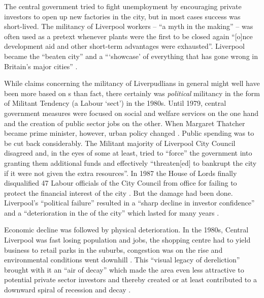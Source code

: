 The central government tried to fight unemployment by encouraging private investors to open up new factories in the city, but in most cases success was short-lived.
The militancy of Liverpool workers -- ``a myth in the making'' -- was often used as a pretext whenever  plants were the first to be closed again ``[o]nce development aid and other short-term advantages were exhausted''\citep[cf.][52]{belchem2006a}.
Liverpool became the ``beaten city'' and a ```showcase' of everything that has gone wrong in Britain's major cities'' \citep[\emph{Daily Mirror}, 11 October 1982, cited in][52--53]{belchem2006a}.

While claims concerning the militancy of Liverpudlians in general might well have been more based on s than fact, there certainly was \emph{political} militancy in the form of Militant Tendency (a Labour `sect') in the 1980s.
Until 1979, central government measures were focused on social and welfare services on the one hand and the creation of public sector jobs on the other. When Margaret Thatcher became prime minister, however, urban policy changed \citep[cf.][19]{juddparkinson1990a}.
Public spending was to be cut back considerably.
The Militant majority of Liverpool City Council disagreed and, in the eyes of some at least, tried to \enquote{force} the government into granting them additional funds and effectively ``threaten[ed] to bankrupt the city if it were not given the extra resources''.
In 1987 the House of Lords finally disqualified 47 Labour officials of the City Council from office for failing to protect the financial interest of the city \citep[cf.][249--250]{parkinson1990}.
But the damage had been done.
Liverpool's ``political failure'' \citep[241]{parkinson1990} resulted in a ``sharp decline in investor confidence'' and a ``deterioration in the  of the city'' which lasted for many years \citep[172]{couch2003a}.

Economic decline was followed by physical deterioration.
In the 1980s, Central Liverpool was fast losing population and jobs, the shopping centre had to yield business to retail parks in the suburbs, congestion was on the rise and environmental conditions went downhill \citep[cf.][38]{couch2003}.
This ``visual legacy of dereliction'' brought with it an ``air of decay'' which made the area even less attractive to potential private sector investors and thereby created or at least contributed to a downward spiral of recession and decay \citep[21]{fraser2003}.

